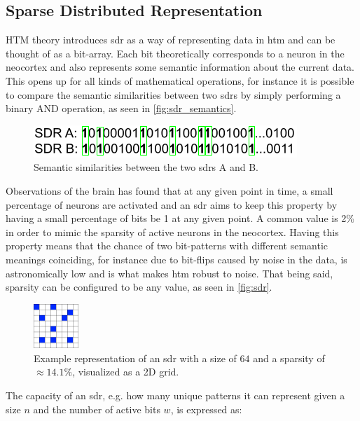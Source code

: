 \subsection{Sparse Distributed Representation}
HTM theory introduces \gls*{sdr} as a way of representing data in \gls*{htm} and can be thought of as a bit-array. Each bit theoretically corresponds to a neuron in the neocortex and also represents some semantic information about the current data. This opens up for all kinds of mathematical operations, for instance it is possible to compare the semantic similarities between two \glspl*{sdr} by simply performing a binary AND operation, as seen in \autoref{fig:sdr_semantics}.
\begin{figure}[htb]
    \centering
    \includegraphics[width=0.7\linewidth]{resources/related_works/sdr-semantics.png}
    \caption[SDR Semantic Comparison]{Semantic similarities between the two \glspl*{sdr} A and B.}
    \label{fig:sdr_semantics}
\end{figure}
\par
Observations of the brain has found that at any given point in time, a small percentage of neurons are activated and an \gls*{sdr} aims to keep this property by having a small percentage of bits be 1 at any given point. A common value is 2\% in order to mimic the sparsity of active neurons in the neocortex. Having this property means that the chance of two bit-patterns with different semantic meanings coinciding, for instance due to bit-flips caused by noise in the data, is astronomically low and is what makes \gls*{htm} robust to noise. That being said, sparsity can be configured to be any value, as seen in \autoref{fig:sdr}.
\begin{figure}[htb]
    \centering
    \includegraphics[width=0.15\textwidth]{resources/related_works/SDR.png}
    \caption[Example SDR]{Example representation of an \gls*{sdr} with a size of $64$ and a sparsity of $\approx14.1\%$, visualized as a 2D grid.}
    \label{fig:sdr}
\end{figure}
\par
The capacity of an \gls*{sdr}, e.g. how many unique patterns it can represent given a size $n$ and the number of active bits $w$, is expressed as:
